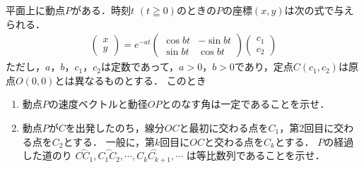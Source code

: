 \documentclass[../../main.tex]{subfiles}
\begin{document}
平面上に動点$P$がある．時刻$t$ $(t\geqq0)$のときの$P$の座標$(x,y)$は次の式で与えられる．
\begin{align*}
  \begin{pmatrix} x \\ y
  \end{pmatrix} = e^{-at}
  \begin{pmatrix} \cos bt & -\sin bt \\ \sin bt & \cos bt
  \end{pmatrix}
  \begin{pmatrix} c_1 \\ c_2
  \end{pmatrix}
\end{align*}
ただし，$a$，$b$，$c_1$，$c_2$は定数であって，$a>0$，$b>0$であり，定点$C(c_1,c_2)$は原点$O(0,0)$とは異なるものとする．
このとき
\begin{enumerate}
  \item 動点$P$の速度ベクトルと動径$OP$とのなす角は一定であることを示せ．
  \item 動点$P$が$C$を出発したのち，線分$OC$と最初に交わる点を$C_1$，第2回目に交わる点を$C_2$とする．
    一般に，第$k$回目に$OC$と交わる点を$C_k$とする．
    $P$の経過した道のり
    $\stackrel{\frown}{CC_1},\stackrel{\frown}{C_1C_2},\cdots,\stackrel{\frown}{C_kC_{k+1}},\cdots$
    は等比数列であることを示せ．
\end{enumerate}
\end{document}
